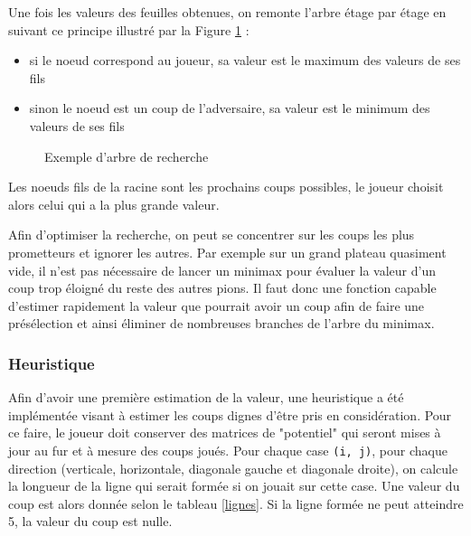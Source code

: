 \documentclass[a4paper,11pt]{article}
\begin{document}
Une fois les valeurs des feuilles obtenues, on remonte l'arbre étage par étage en suivant ce principe illustré par la Figure \ref{arbre1} :

\begin{itemize}
    \item si le noeud correspond au joueur, sa valeur est le maximum des valeurs de ses fils
    \item sinon le noeud est un coup de l'adversaire, sa valeur est le minimum des valeurs de ses fils
\end{itemize}

\begin{figure}[h]
    \centering
    \caption{Exemple d'arbre de recherche}
    \label{arbre1}
\end{figure}

Les noeuds fils de la racine sont les prochains coups possibles, le joueur choisit alors celui qui a la plus grande valeur.

Afin d'optimiser la recherche, on peut se concentrer sur les coups les plus prometteurs et ignorer les autres. Par exemple sur un grand plateau quasiment vide, il n'est pas nécessaire de lancer un minimax pour évaluer la valeur d'un coup trop éloigné du reste des autres pions. Il faut donc une fonction capable d'estimer rapidement la valeur que pourrait avoir un coup afin de faire une présélection et ainsi éliminer de nombreuses branches de l'arbre du minimax.


\subsubsection{Heuristique}
\label{heur}

Afin d'avoir une première estimation de la valeur, une heuristique a été implémentée visant à estimer les coups dignes d'être pris en considération. Pour ce faire, le joueur doit conserver des matrices de "potentiel" qui seront mises à jour au fur et à mesure des coups joués.
Pour chaque case \verb+(i, j)+, pour chaque direction (verticale, horizontale, diagonale gauche et diagonale droite), on calcule la longueur de la ligne qui serait formée si on jouait sur cette case. Une valeur du coup est alors donnée selon le tableau \ref{lignes}. Si la ligne formée ne peut atteindre 5, la valeur du coup est nulle.
\end{document}
